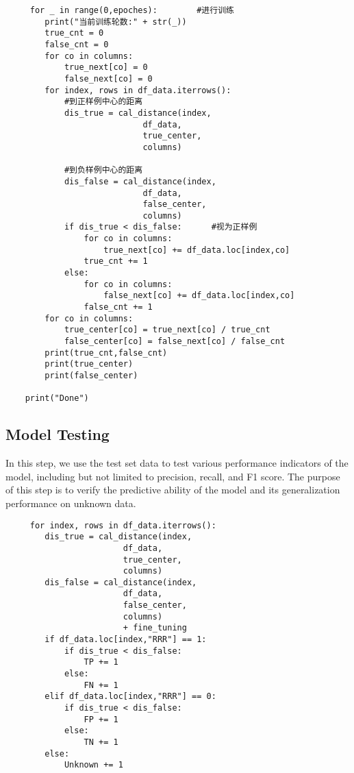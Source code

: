 \documentclass[twocolumn]{article}
\begin{document}
\begin{lstlisting}
     for _ in range(0,epoches):        #进行训练
        print("当前训练轮数:" + str(_))
        true_cnt = 0
        false_cnt = 0
        for co in columns:
            true_next[co] = 0
            false_next[co] = 0
        for index, rows in df_data.iterrows():
            #到正样例中心的距离
            dis_true = cal_distance(index,
                            df_data,
                            true_center,
                            columns)  
                                    
            #到负样例中心的距离
            dis_false = cal_distance(index,
                            df_data,
                            false_center,
                            columns)         
            if dis_true < dis_false:      #视为正样例
                for co in columns:
                    true_next[co] += df_data.loc[index,co]
                true_cnt += 1
            else:
                for co in columns:
                    false_next[co] += df_data.loc[index,co]
                false_cnt += 1
        for co in columns:
            true_center[co] = true_next[co] / true_cnt
            false_center[co] = false_next[co] / false_cnt
        print(true_cnt,false_cnt)
        print(true_center)
        print(false_center)

    print("Done")
\end{lstlisting}

\subsection{Model Testing}

In this step, we use the test set data to test various performance indicators of the model, including but not limited to precision, recall, and F1 score. The purpose of this step is to verify the predictive ability of the model and its generalization performance on unknown data.

\begin{lstlisting}
     for index, rows in df_data.iterrows(): 
        dis_true = cal_distance(index,
                        df_data,
                        true_center,
                        columns)  
        dis_false = cal_distance(index,
                        df_data,
                        false_center,
                        columns) 
                        + fine_tuning       
        if df_data.loc[index,"RRR"] == 1:
            if dis_true < dis_false:
                TP += 1
            else:
                FN += 1
        elif df_data.loc[index,"RRR"] == 0:
            if dis_true < dis_false:
                FP += 1
            else:
                TN += 1
        else:
            Unknown += 1
\end{lstlisting}
\end{document}
